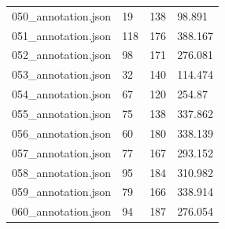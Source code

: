 \documentclass[runningheads]{llncs}
\begin{document}
\begin{table}[h!]
\begin{tabular}{|p{3.0cm}|p{3.0cm}|p{3.0cm}|p{3.0cm}|}
050\_annotation.json & 19 & 138 & 98.891 \\
051\_annotation.json & 118 & 176 & 388.167 \\
052\_annotation.json & 98 & 171 & 276.081 \\
053\_annotation.json & 32 & 140 & 114.474 \\
054\_annotation.json & 67 & 120 & 254.87 \\
055\_annotation.json & 75 & 138 & 337.862 \\
056\_annotation.json & 60 & 180 & 338.139 \\
057\_annotation.json & 77 & 167 & 293.152 \\
058\_annotation.json & 95 & 184 & 310.982 \\
059\_annotation.json & 79 & 166 & 338.914 \\
060\_annotation.json & 94 & 187 & 276.054 \\
\hline


\end{tabular}
\end{table}
\end{document}

